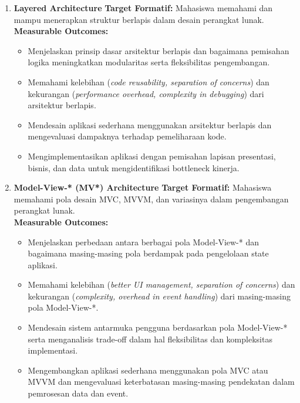 \begin{enumerate}
\item \textbf{Layered Architecture}  
\textbf{Target Formatif:} Mahasiswa memahami dan mampu menerapkan struktur berlapis dalam desain perangkat lunak.  \\
\textbf{Measurable Outcomes:}
\begin{itemize}
\item Menjelaskan prinsip dasar arsitektur berlapis dan bagaimana pemisahan logika meningkatkan modularitas serta fleksibilitas pengembangan.
\item Memahami kelebihan (\textit{code reusability, separation of concerns}) dan kekurangan (\textit{performance overhead, complexity in debugging}) dari arsitektur berlapis.
\item Mendesain aplikasi sederhana menggunakan arsitektur berlapis dan mengevaluasi dampaknya terhadap pemeliharaan kode.
\item Mengimplementasikan aplikasi dengan pemisahan lapisan presentasi, bisnis, dan data untuk mengidentifikasi bottleneck kinerja.
\end{itemize}

\item \textbf{Model-View-* (MV*) Architecture}  
\textbf{Target Formatif:} Mahasiswa memahami pola desain MVC, MVVM, dan variasinya dalam pengembangan perangkat lunak.  \\
\textbf{Measurable Outcomes:}
\begin{itemize}
\item Menjelaskan perbedaan antara berbagai pola Model-View-* dan bagaimana masing-masing pola berdampak pada pengelolaan state aplikasi.
\item Memahami kelebihan (\textit{better UI management, separation of concerns}) dan kekurangan (\textit{complexity, overhead in event handling}) dari masing-masing pola Model-View-*.
\item Mendesain sistem antarmuka pengguna berdasarkan pola Model-View-* serta menganalisis trade-off dalam hal fleksibilitas dan kompleksitas implementasi.
\item Mengembangkan aplikasi sederhana menggunakan pola MVC atau MVVM dan mengevaluasi keterbatasan masing-masing pendekatan dalam pemrosesan data dan event.
\end{itemize}


\end{enumerate}
